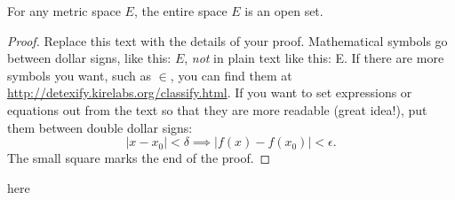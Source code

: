 \documentclass{article}
\newenvironment{theorem}[2][Theorem]{\begin{trivlist}
\item[\hskip \labelsep {\bfseries #1}\hskip \labelsep {\bfseries #2.}]}{\end{trivlist}}
\begin{document}
%

\begin{theorem}{(Page 4 $\#$ 6)}
For any metric space $E$, the entire space $E$ is an open set.
\end{theorem}

\begin{proof}
Replace this text with the details of your proof. Mathematical symbols go between dollar signs, like this: $E$, \emph{not} in plain text like this: E. If there are more symbols you want, such as $\in$, you can find them at\\ \url{http://detexify.kirelabs.org/classify.html}. If you want to set expressions or equations out from the text so that they are more readable (great idea!), put them between double dollar signs: $$|x-x_0| < \delta \implies |f(x)-f(x_0)| < \epsilon.$$
The small square marks the end of the proof.
\end{proof}

\cite{Smith:2022qr} here


\end{document}
